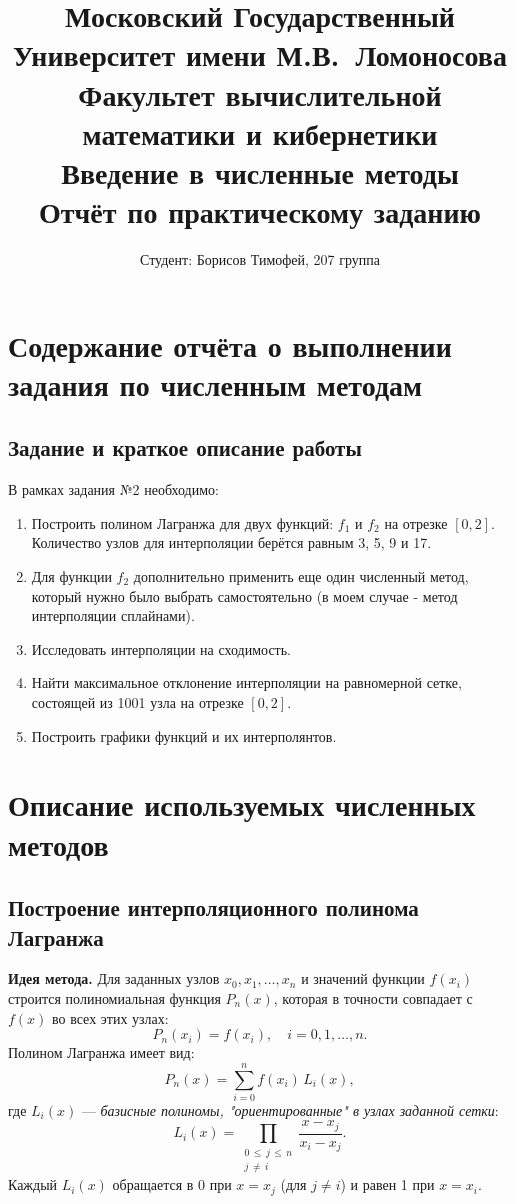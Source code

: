 \documentclass[a4paper, fleqn]{report}
\title{
\textbf{Московский Государственный Университет имени М.В.\ Ломоносова}\\
\textbf{Факультет вычислительной математики и кибернетики}\\
\textbf{Введение в численные методы}\\
Отчёт по практическому заданию
}
\author{
Студент: Борисов Тимофей, 207 группа
}
\date{\number\year}
\begin{document}
\maketitle

\tableofcontents

\chapter{Содержание отчёта о выполнении задания по численным методам}

\section*{Задание и краткое описание работы}

В рамках задания №2 необходимо:
\begin{enumerate}
    \item Построить полином Лагранжа для двух функций: \( f_1 \) и \( f_2 \) на отрезке \([0, 2]\). Количество узлов для интерполяции берётся равным 3, 5, 9 и 17.
    \item Для функции \( f_2 \) дополнительно применить еще один численный метод, который нужно было выбрать самостоятельно (в моем случае - метод интерполяции сплайнами).
    \item Исследовать интерполяции на сходимость.
    \item Найти максимальное отклонение интерполяции на равномерной сетке, состоящей из 1001 узла на отрезке \([0, 2]\).
    \item Построить графики функций и их интерполянтов.
\end{enumerate}

\newpage

\chapter{Описание используемых численных методов}

\section{Построение интерполяционного полинома Лагранжа}

\textbf{Идея метода.} Для заданных узлов \( x_0, x_1, \ldots, x_n \) и значений функции \( f(x_i) \) строится полиномиальная функция \( P_n(x) \), которая в точности совпадает с \( f(x) \) во всех этих узлах:
\[
P_n(x_i) = f(x_i), \quad i = 0,1,\ldots,n.
\]
Полином Лагранжа имеет вид:
\[
P_n(x) = \sum_{i=0}^{n} f(x_i) \, L_i(x),
\]
где \(\displaystyle L_i(x)\) --- \textit{базисные полиномы, "ориентированные" в узлах заданной сетки}:
\[
L_i(x) = \prod_{\substack{0 \,\le\, j \,\le\, n \\ j \,\neq\, i}} \frac{x - x_j}{x_i - x_j}.
\]
Каждый \( L_i(x) \) обращается в 0 при \( x = x_j \) (для \( j \neq i \)) и равен 1 при \( x = x_i \).
\end{document}
